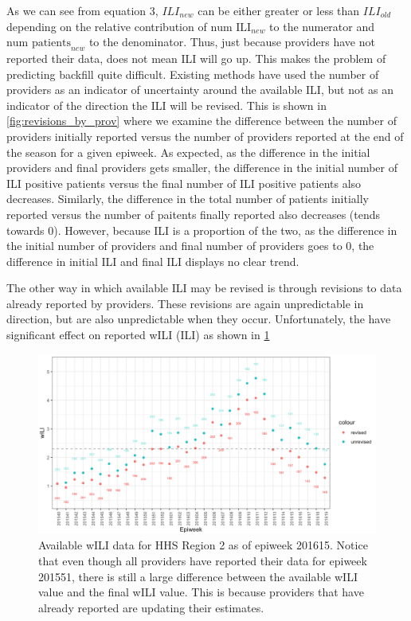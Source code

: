 \documentclass{umassthesis}          %
\begin{document}
As we can see from equation 3, $ILI_{new}$ can be either greater or less than $ILI_{old}$ depending on the relative contribution of $\text{num ILI}_{new}$ to the numerator and $\text{num patients}_{new}$ to the denominator. Thus, just because providers have not reported their data, does not mean ILI will go up. This makes the problem of predicting backfill quite difficult. Existing methods have used the number of providers as an indicator of uncertainty around the available ILI, but not as an indicator of the direction the ILI will be revised. This is shown in \ref{fig:revisions_by_prov} where we examine the difference between the number of providers initially reported versus the number of providers reported at the end of the season for a given epiweek. As expected, as the difference in the initial providers and final providers gets smaller, the difference in the initial number of ILI positive patients versus the final number of ILI positive patients also decreases. Similarly, the difference in the total number of patients initially reported versus the number of paitents finally reported also decreases (tends towards 0). However, because ILI is a proportion of the two, as the difference in the initial number of providers and final number of providers goes to 0, the difference in initial ILI and final ILI displays no clear trend. 




The other way in which available ILI may be revised is through revisions to data already reported by providers. These revisions are again unpredictable in direction, but are also unpredictable when they occur. Unfortunately, the have significant effect on reported wILI (ILI) as shown in \ref{fig:same_prov_diff} 


\begin{figure}[H]
    \centering
    \includegraphics[scale=.35]{same_prov_diff.png}
    \caption{Available wILI data for HHS Region 2 as of epiweek 201615. Notice that even though all providers have reported their data for epiweek 201551, there is still a large difference between the available wILI value and the final wILI value. This is because providers that have already reported are updating their estimates.}
    \label{fig:same_prov_diff}
\end{figure}
\end{document}
